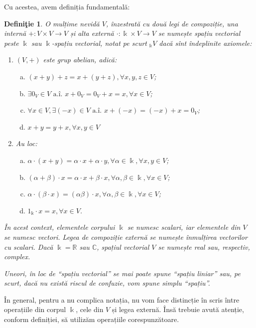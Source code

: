 \documentclass[11pt,a4paper]{article}
\newcommand\ai{\text{ a.\^{i}. }}
\theoremstyle{dotless}
\theoremstyle{dotlessdr}
\newtheorem{definition}{Defini\c{t}ie}[section]
\begin{document}
Cu acestea, avem definiția fundamentală:
\begin{definition}
O mulțime nevidă $V$, înzestrată cu două legi de compoziție, una internă 
$+ : V \times V \to V$ și alta externă $\cdot : \Bbbk \times V \to V$ se 
numește \emph{spațiu vectorial peste $\Bbbk$} sau $\Bbbk$-spațiu vectorial, 
notat pe scurt $_\Bbbk V$ dacă sînt îndeplinite axiomele:
\begin{enumerate}[(1)]
\item $(V, +)$ este grup abelian, adică:
\begin{enumerate}[(a)]
    \item $(x + y) + z = x + (y + z), \forall x,y,z \in V$;
    \item $\exists 0_V \in V \ai x + 0_V = 0_V + x = x, \forall x \in V$;
    \item $\forall x \in V, \exists (-x) \in V \ai x + (-x) = (-x)+x = 0_V$;
    \item $x + y = y + x, \forall x, y \in V$
\end{enumerate}
\item Au loc:
\begin{enumerate}[(a)]
    \item $\alpha \cdot (x + y) = \alpha \cdot x + \alpha \cdot y, 
    \forall \alpha \in \Bbbk, \forall x,y \in V$;
    \item $(\alpha + \beta) \cdot x = \alpha \cdot x + \beta \cdot x, 
    \forall \alpha, \beta \in \Bbbk, \forall x \in V$;
    \item $\alpha \cdot (\beta \cdot x) = (\alpha \beta) \cdot x, 
    \forall \alpha,\beta \in \Bbbk, \forall x \in V$;
    \item $1_\Bbbk \cdot x = x, \forall x \in V$.
\end{enumerate}
\end{enumerate}

În acest context, elementele corpului $\Bbbk$ se numesc \emph{scalari}, iar 
elementele din $V$ se numesc \emph{vectori}. Legea de compoziție externă se 
numește \emph{înmulțirea vectorilor cu scalari}. Dacă $\Bbbk = \mathbb{R}$ 
sau $\mathbb{C}$, spațiul vectorial $V$ se numește real sau, respectiv, complex.

Uneori, în loc de \enquote{spațiu vectorial} se mai poate spune 
\enquote{\emph{spațiu liniar}} sau, pe scurt, dacă nu există riscul de 
confuzie, vom spune simplu \enquote{spațiu}.
\end{definition}

În general, pentru a nu complica notația, nu vom face distincție în scris 
între operațiile din corpul $\Bbbk$, cele din $V$ și legea externă. Însă trebuie 
avută atenție, conform definiției, să utilizăm operațiile corespunzătoare.
\end{document}
